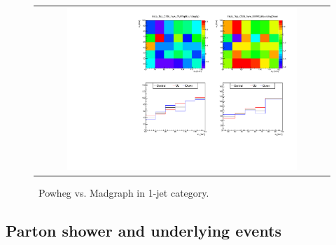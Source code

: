 \begin{figure}[htp]
\centering
\begin{tabular}{c}
\includegraphics[width=0.8\textwidth]{figures/histo_Top_CMS_hww_MVATopBounding_1j_zoom.pdf}
\end{tabular}
\caption{ \topbkg\ Powheg vs. Madgraph in 1-jet category.}
\label{fig:alter_top}
\end{figure}

\subsection{Parton shower and underlying events}

